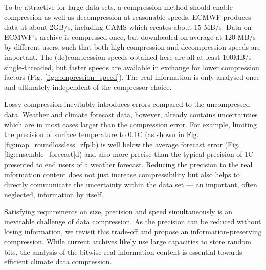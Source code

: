 To be attractive for large data sets, a compression method should enable compression as well as decompression at reasonable speeds.
ECMWF produces data at about 2GB/s, including CAMS which creates about 15 MB/s. Data on ECMWF’s archive is compressed once,
but downloaded on average at 120 MB/s by different users, such that both high compression and decompression speeds are important.
The (de)compression speeds obtained here are all at least 100MB/s single-threaded, but faster speeds
are available in exchange for lower compression factors (Fig. \ref{fig:compression_speed}). The real information is only analysed once
and ultimately independent of the compressor choice.

Lossy compression inevitably introduces errors compared to the uncompressed data. Weather and climate forecast data, however,
already contains uncertainties which are in most cases larger than the compression error. For example, limiting the precision of
surface temperature to 0.1\textdegree{}C (as shown in Fig. \ref{fig:map_roundlossless_zfp}b) is well below the average forecast error
(Fig. \ref{fig:ensemble_forecast}d) and also more precise than the typical precision of 1\textdegree{}C presented to end users of a
weather forecast. Reducing the precision to the real information content does not just increase compressibility but also helps to
directly communicate the uncertainty within the data set — an important, often neglected, information by itself.

Satisfying requirements on size, precision and speed simultaneously is an inevitable challenge of data compression. As the precision
can be reduced without losing information, we revisit this trade-off and propose an information-preserving compression. While current
archives likely use large capacities to store random bits, the analysis of the bitwise real information content is essential towards
efficient climate data compression.

\newpage
